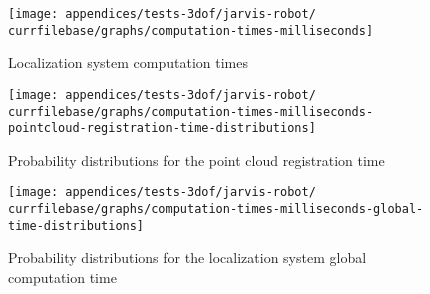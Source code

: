 \begin{figure}[H]
	\centering
	\texttt{[image: appendices/tests-3dof/jarvis-robot/\\currfilebase/graphs/computation-times-milliseconds]}
	\caption{Localization system computation times}
\end{figure}

\begin{figure}[H]
	\centering
	\texttt{[image: appendices/tests-3dof/jarvis-robot/\\currfilebase/graphs/computation-times-milliseconds-pointcloud-registration-time-distributions]}
	\caption{Probability distributions for the point cloud registration time}
\end{figure}

\begin{figure}[H]
	\centering
	\texttt{[image: appendices/tests-3dof/jarvis-robot/\\currfilebase/graphs/computation-times-milliseconds-global-time-distributions]}
	\caption{Probability distributions for the localization system global computation time}
\end{figure}
